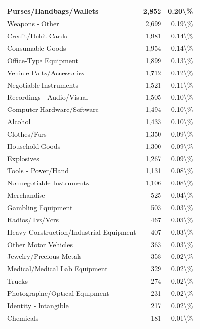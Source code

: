 \documentclass[
]{krantz}
\begin{document}
\begin{longtable}[t]{l|r|r}
\hline
Purses/Handbags/Wallets & 2,852 & 0.20\textbackslash{}\%\\
\hline
Weapons - Other & 2,699 & 0.19\textbackslash{}\%\\
\hline
Credit/Debit Cards & 1,981 & 0.14\textbackslash{}\%\\
\hline
Consumable Goods & 1,954 & 0.14\textbackslash{}\%\\
\hline
Office-Type Equipment & 1,899 & 0.13\textbackslash{}\%\\
\hline
Vehicle Parts/Accessories & 1,712 & 0.12\textbackslash{}\%\\
\hline
Negotiable Instruments & 1,521 & 0.11\textbackslash{}\%\\
\hline
Recordings - Audio/Visual & 1,505 & 0.10\textbackslash{}\%\\
\hline
Computer Hardware/Software & 1,494 & 0.10\textbackslash{}\%\\
\hline
Alcohol & 1,433 & 0.10\textbackslash{}\%\\
\hline
Clothes/Furs & 1,350 & 0.09\textbackslash{}\%\\
\hline
Household Goods & 1,300 & 0.09\textbackslash{}\%\\
\hline
Explosives & 1,267 & 0.09\textbackslash{}\%\\
\hline
Tools - Power/Hand & 1,131 & 0.08\textbackslash{}\%\\
\hline
Nonnegotiable Instruments & 1,106 & 0.08\textbackslash{}\%\\
\hline
Merchandise & 525 & 0.04\textbackslash{}\%\\
\hline
Gambling Equipment & 503 & 0.03\textbackslash{}\%\\
\hline
Radios/Tvs/Vcrs & 467 & 0.03\textbackslash{}\%\\
\hline
Heavy Construction/Industrial Equipment & 407 & 0.03\textbackslash{}\%\\
\hline
Other Motor Vehicles & 363 & 0.03\textbackslash{}\%\\
\hline
Jewelry/Precious Metals & 358 & 0.02\textbackslash{}\%\\
\hline
Medical/Medical Lab Equipment & 329 & 0.02\textbackslash{}\%\\
\hline
Trucks & 274 & 0.02\textbackslash{}\%\\
\hline
Photographic/Optical Equipment & 231 & 0.02\textbackslash{}\%\\
\hline
Identity - Intangible & 217 & 0.02\textbackslash{}\%\\
\hline
Chemicals & 181 & 0.01\textbackslash{}\%\\

\end{longtable}
\end{document}
